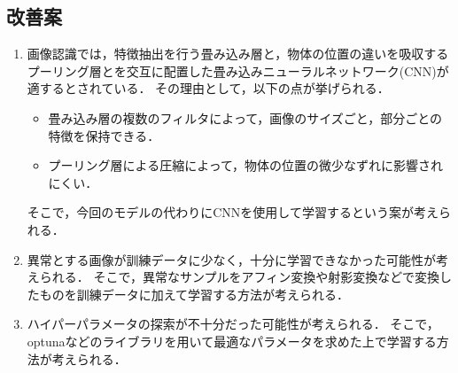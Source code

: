 \documentclass[10pt]{jarticle}
\begin{document}
\subsection{改善案}
\begin{enumerate}
\item 画像認識では，特徴抽出を行う畳み込み層と，物体の位置の違いを吸収するプーリング層とを交互に配置した畳み込みニューラルネットワーク(CNN)が適するとされている．
その理由として，以下の点が挙げられる．
\begin{itemize}
\item 畳み込み層の複数のフィルタによって，画像のサイズごと，部分ごとの特徴を保持できる．
\item プーリング層による圧縮によって，物体の位置の微少なずれに影響されにくい．
\end{itemize}
そこで，今回のモデルの代わりにCNNを使用して学習するという案が考えられる．
\item 異常とする画像が訓練データに少なく，十分に学習できなかった可能性が考えられる．
そこで，異常なサンプルをアフィン変換や射影変換などで変換したものを訓練データに加えて学習する方法が考えられる．

\item ハイパーパラメータの探索が不十分だった可能性が考えられる．
そこで，optunaなどのライブラリを用いて最適なパラメータを求めた上で学習する方法が考えられる．
\end{enumerate}
\end{document}
